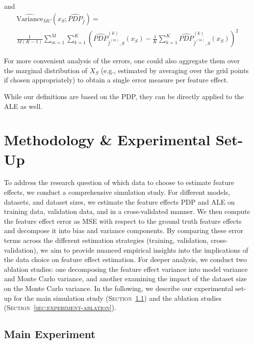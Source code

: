 \documentclass[runningheads]{llncs}
\begin{document}
\noindent and
\begin{equation}
    \begin{split}
        \widehat{\text{Variance}}_{MC}(x_S; \widehat{PDP}_{\hat{f}}) = \\ \frac{1}{M(K-1)}\sum_{m=1}^M \sum_{k=1}^K
        \left(\widehat{PDP}_{\hat f^{(m)},S}^{(k)}(x_S) - \frac{1}{K}\sum_{k=1}^K \widehat{PDP}_{\hat f^{(m)},S}^{(k)}(x_S)\right)^2
    \end{split}
    \label{eq:mc-variance-estimator-model}
\end{equation}

\noindent For more convenient analysis of the errors, one could also
aggregate them over the marginal distribution of $X_S$ (e.g.,
estimated by averaging over the grid points if chosen appropriately)
to obtain a single error measure per feature effect.

While our definitions are based on the PDP, they can be directly applied to the
ALE as well.

\section{Methodology \& Experimental Set-Up}\label{sec:methodology-set-up}

To address the research question of which data to choose to estimate feature
effects, we conduct a comprehensive simulation study. For different models,
datasets, and dataset sizes, we estimate the feature effects PDP and ALE on
training data, validation data, and in a cross-validated manner. We then
compute the feature effect error as MSE with respect to the ground truth
feature effects and decompose it into bias and variance components. By
comparing these error terms across the different estimation strategies
(training, validation, cross-validation), we aim to provide nuanced empirical
insights into the implications of the data choice on feature effect estimation.
For deeper analysis, we conduct two ablation studies: one decomposing the
feature effect variance into model variance and Monte Carlo variance, and
another examining the impact of the dataset size on the Monte Carlo variance.
In the following, we describe our experimental set-up for the main simulation
study (\textsc{Section~\ref{sec:experiment-main}}) and the ablation studies
(\textsc{Section~\ref{sec:experiment-ablation}}).

\subsection{Main Experiment}\label{sec:experiment-main}
\end{document}
